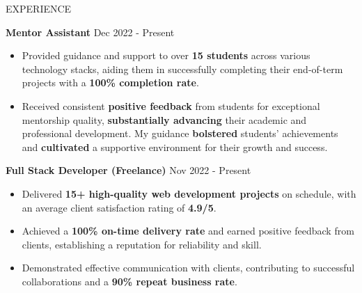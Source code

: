 \documentclass{resume} %
\begin{document}
\begin{rSection}{EXPERIENCE}

\textbf{Mentor Assistant} \hfill Dec 2022 - Present
\begin{itemize}
    \item Provided guidance and support to over \textbf{15 students} across various technology stacks, aiding them in successfully completing their end-of-term projects with a \textbf{100\% completion rate}.
    \item Received consistent \textbf{positive feedback} from students for exceptional mentorship quality, \textbf{substantially advancing} their academic and professional development. My guidance \textbf{bolstered} students' achievements and \textbf{cultivated} a supportive environment for their growth and success.

\end{itemize}

\textbf{Full Stack Developer (Freelance)} \hfill Nov 2022 - Present
\begin{itemize}
    \item Delivered \textbf{15+ high-quality web development projects} on schedule, with an average client satisfaction rating of \textbf{4.9/5}.
    \item Achieved a \textbf{100\% on-time delivery rate} and earned positive feedback from clients, establishing a reputation for reliability and skill.
    \item Demonstrated effective communication with clients, contributing to successful collaborations and a \textbf{90\% repeat business rate}.
\end{itemize}

\end{rSection}

\end{document}
